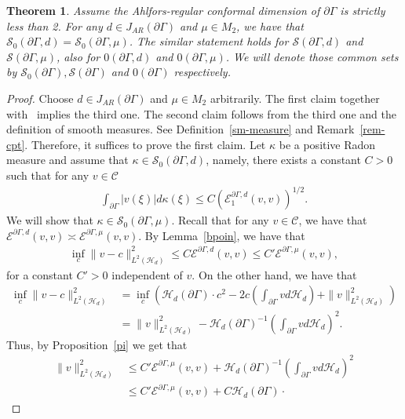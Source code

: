 \documentclass[10pt]{amsart}
\newtheorem{theo}{Theorem}[section]
\theoremstyle{definition}\newtheorem{defi}[theo]{Definition}\newtheorem{rema}[theo]{Remark}\newtheorem{exam}[theo]{Example}\newtheorem{exem}[theo]{Example}\newtheorem{nota}[theo]{Notation}
\newcommand{\ce}{\mathcal{E}}
\newcommand{\cs}{\mathcal{S}}
\newcommand{\ch}{\mathcal{H}}
\newcommand{\cC}{\mathcal{C}}
\begin{document}
\begin{theo}\label{s}
Assume the Ahlfors-regular conformal dimension of $\partial\Gamma$ is strictly less than 2. For any $d\in J_{AR}(\partial\Gamma)$ and $\mu\in M_2$, we have that $\cs_0(\partial\Gamma,d)=\cs_0(\partial\Gamma,\mu)$. The similar statement holds for $\cs(\partial\Gamma,d)$ and $\cs(\partial\Gamma,\mu)$, also for $0(\partial\Gamma,d)$ and $0(\partial\Gamma,\mu)$. We will denote those common sets by $\cs_0(\partial\Gamma), \cs(\partial\Gamma)$ and $0(\partial\Gamma)$ respectively.
\end{theo}

\begin{proof}
Choose $d\in J_{AR}(\partial\Gamma)$ and $\mu\in M_2$ arbitrarily.
The first claim together with~\cite[Theorem~2.2.3]{FOT} implies the third one. The second claim follows from the third one and the definition of smooth measures. See Definition~\ref{sm-measure} and Remark~\ref{rem-cpt}. Therefore, it suffices to prove the first claim. Let $\kappa$ be a positive Radon measure and assume that $\kappa\in\cs_0(\partial\Gamma,d)$, namely, there exists a constant $C>0$ such that for any $v\in\cC$
\begin{align}\label{nuh}
\int_{\partial\Gamma}|v(\xi)|d\kappa(\xi)\leq C\left(\ce^{\partial\Gamma,d}_1(v,v)\right)^{1/2}.
\end{align}
We will show that $\kappa\in\cs_0(\partial\Gamma,\mu)$. Recall that for any $v\in\cC$, we have that $\ce^{\partial\Gamma,d}(v,v)\asymp \ce^{\partial\Gamma,\mu}(v,v)$. By Lemma~\ref{bpoin}, we have that
\begin{align*}
\inf_{c}\|v-c\|^2_{L^2(\ch_{d})}\leq C\ce^{\partial\Gamma,d}(v,v)\leq C'\ce^{\partial\Gamma,\mu}(v,v),
\end{align*}
for a constant $C'>0$ independent of $v$. On the other hand, we have that
\begin{align*}
\inf_{c}\|v-c\|^2_{L^2(\ch_{d})}&=\inf_c\left(\ch_{d}(\partial\Gamma)\cdot c^2-2c\left(\int_{\partial\Gamma}vd\ch_{d}\right)+\|v\|^2_{L^2(\ch_{d})}\right)\\
&=\|v\|^2_{L^2(\ch_{d})}-\ch_{d}(\partial\Gamma)^{-1}\left(\int_{\partial\Gamma}vd\ch_{d}\right)^2.
\end{align*}
Thus, by Proposition~\ref{pi} we get that
\begin{align*}
\|v\|^2_{L^2(\ch_{d})}&\leq C'\ce^{\partial\Gamma,\mu}(v,v)+\ch_{d}(\partial\Gamma)^{-1}\left(\int_{\partial\Gamma}vd\ch_{d}\right)^2
\\
&\leq C'\ce^{\partial\Gamma,\mu}(v,v)+C\ch_{d}(\partial\Gamma)\cdot

\end{align*}
\end{proof}
\end{document}
